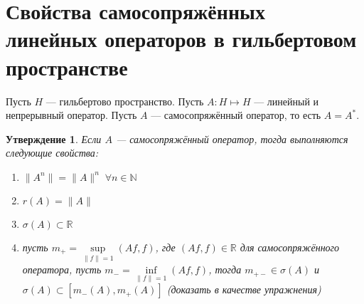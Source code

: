 \documentclass[12pt]{article}
\begin{document}
\newtheorem{Theor}{Теорема}
\newtheorem{Utv}{Утверждение}
\newtheorem{Opr}{Опреление}
\newtheorem{Prim}{Пример}
\newtheorem{Upr}{Упражнение}
\newtheorem{Nabl}{Наблюдение}
\newtheorem{Zam}{Замечание}
\section*{Свойства самосопряжённых линейных операторов в гильбертовом 
пространстве}
Пусть $H$ --- гильбертово пространство.
Пусть $A : H \mapsto H$ --- линейный и непрерывный оператор.
Пусть $A$ --- самосопряжённый оператор, то есть $A = A^*$.
\begin{Utv}
    Если $A$ --- самосопряжённый оператор, тогда выполняются следующие
    свойства:
    \begin{enumerate}
        \item{$\|A^n\| = \|A\|^n\; \forall n \in \mathbb N$}
        \item{$r(A) = \|A\|$}
        \item{$\sigma(A) \subset \mathbb R$}
        \item{пусть $m_+ = \sup \limits_{\|f\| = 1} (Af, f)$, где $(Af, f) \in 
                \mathbb R$ для самосопряжённого оператора, пусть $m_- = \inf 
                \limits_{\|f\| = 1} (Af, f)$, тогда $m_{+-} \in \sigma(A)$ и
                $\sigma(A) \subset [m_-(A), m_+(A)]$ (доказать в качестве
            упражнения)}
    \end{enumerate}
\end{Utv}
\end{document}
